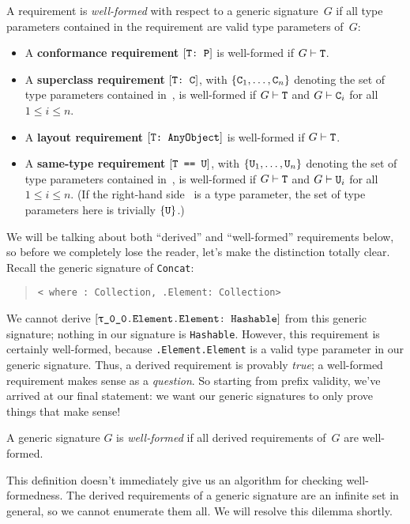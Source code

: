 \documentclass[../generics]{subfiles}
\begin{document}
\begin{definition}\label{valid requirement}
A requirement is \emph{well-formed} with respect to a generic signature~$G$ if all type parameters contained in the requirement are valid type parameters of~$G$:
\begin{itemize}
\item A \textbf{conformance requirement} $[\texttt{T:~P}]$ is well-formed if $G\vdash\texttt{T}$.
\item A \textbf{superclass requirement} $[\texttt{T:~C}]$, with $\{\texttt{C}_1,\ldots,\texttt{C}_n\}$ denoting the set of type parameters contained in~\tC, is well-formed if $G\vdash\texttt{T}$ and $G\vdash\texttt{C}_i$ for all $1\le i\le n$.
\item A \textbf{layout requirement} $[\texttt{T:~AnyObject}]$ is well-formed if $G\vdash\texttt{T}$.
\item A \textbf{same-type requirement} $[\texttt{T == U}]$, with $\{\texttt{U}_1,\ldots,\texttt{U}_n\}$ denoting the set of type parameters contained in~\tU, is well-formed if $G\vdash\texttt{T}$ and $G\vdash\texttt{U}_i$ for all $1\le i\le n$. (If the right-hand side \tU\ is a type parameter, the set of type parameters here is trivially $\{\texttt{U}\}$.)
\end{itemize}
\end{definition}

We will be talking about both ``derived'' and ``well-formed'' requirements below, so before we completely lose the reader, let's make the distinction totally clear. Recall the generic signature of \texttt{Concat}:
\begin{quote}
\texttt{<\rT~where \rT:~Collection, \rT.Element:~Collection>}
\end{quote}
We cannot derive $\ConfReq{\rT.Element.Element}{Hashable}$ from this generic signature; nothing in our signature is \texttt{Hashable}. However, this requirement is certainly well-formed, because \texttt{\rT.Element.Element} is a valid type parameter in our generic signature. Thus, a derived requirement is provably \emph{true}; a well-formed requirement makes sense as a \emph{question}. So starting from prefix validity, we've arrived at our final statement: we want our generic signatures to only prove things that make sense!

\begin{definition}\label{valid generic signature def}
A generic signature $G$ is \emph{well-formed} if all derived requirements of~$G$ are well-formed.
\end{definition}
This definition doesn't immediately give us an algorithm for checking well-formedness. The derived requirements of a generic signature are an infinite set in general, so we cannot enumerate them all. We will resolve this dilemma shortly.
\end{document}
